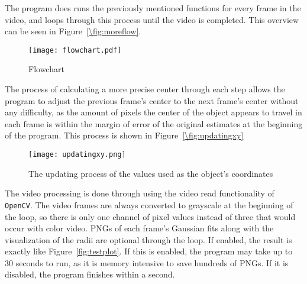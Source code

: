 The program does runs the previously mentioned functions for every frame in the video, and loops through this process until the video is completed. This overview can be seen in Figure~\ref{\fig:moreflow}.

\begin{figure}[ht!]
	\centering
	\texttt{[image: flowchart.pdf]}
	\caption{Flowchart}
	\label{fig:moreflow}
\end{figure}

The process of calculating a more precise center through each step allows the program to adjust the previous frame's center to the next frame's center without any difficulty, as the amount of pixels the center of the object appears to travel in each frame is within the margin of error of the original estimates at the beginning of the program. This process is shown in Figure~\ref{\fig:updatingxy}

\begin{figure}[htpb]
	\centering
	\texttt{[image: updatingxy.png]}
	\caption{The updating process of the values used as the object's coordinates}
	\label{fig:updatingxy}
\end{figure}

The video processing is done through using the video read functionality of \texttt{OpenCV}. The video frames are always converted to grayscale at the beginning of the loop, so there is only one channel of pixel values instead of three that would occur with color video.  PNGs of each frame's Gaussian fits along with the visualization of the radii are optional through the loop. If enabled, the result is exactly like Figure~\ref{fig:testplot}. If this is enabled, the program may take up to 30 seconds to run, as it is memory intensive to save hundreds of PNGs. If it is disabled, the program finishes within a second.




